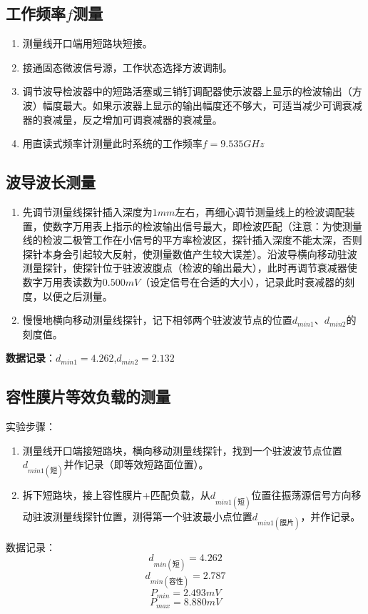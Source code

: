 \documentclass{../source/zjureport}
\begin{document}
        \subsection{工作频率$f$测量}
            \begin{enumerate}
                \item 测量线开口端用短路块短接。
                \item 接通固态微波信号源，工作状态选择方波调制。
                \item 调节波导检波器中的短路活塞或三销钉调配器使示波器上显示的检波输出（方波）幅度最大。如果示波器上显示的输出幅度还不够大，可适当减少可调衰减器的衰减量，反之增加可调衰减器的衰减量。
                \item 用直读式频率计测量此时系统的工作频率$f = 9.535GHz$
            \end{enumerate}
        \subsection{波导波长测量}
            \begin{enumerate}
                \item 先调节测量线探针插入深度为$1mm$左右，再细心调节测量线上的检波调配装置，使数字万用表上指示的检波输出信号最大，即检波匹配（注意：为使测量线的检波二极管工作在小信号的平方率检波区，探针插入深度不能太深，否则探针本身会引起较大反射，使测量数值产生较大误差）。沿波导横向移动驻波测量探针，使探针位于驻波波腹点（检波的输出最大），此时再调节衰减器使数字万用表读数为$0.500mV$（设定信号在合适的大小），记录此时衰减器的刻度，以便之后测量。
                \item 慢慢地横向移动测量线探针，记下相邻两个驻波波节点的位置$d_{min1}、d_{min2}$的刻度值。
            \end{enumerate}

            {\bf 数据记录}：$d_{min1}= 4.262$,$d_{min2} = 2.132$

        \subsection{容性膜片等效负载的测量}
            实验步骤：
            \begin{enumerate}
                \item 测量线开口端接短路块，横向移动测量线探针，找到一个驻波波节点位置$d_{min1(\text{短})}$并作记录（即等效短路面位置）。
                \item 拆下短路块，接上容性膜片+匹配负载，从$d_{min1(\text{短})}$位置往振荡源信号方向移动驻波测量线探针位置，测得第一个驻波最小点位置$d_{min1(\text{膜片})}$，并作记录。
            \end{enumerate}
            数据记录：
            $$d_{min(\text{短})} = 4.262$$
            $$d_{min(\text{容性})} = 2.787$$
            $$P_{min} = 2.493mV$$
            $$P_{max} = 8.880mV$$
\end{document}
